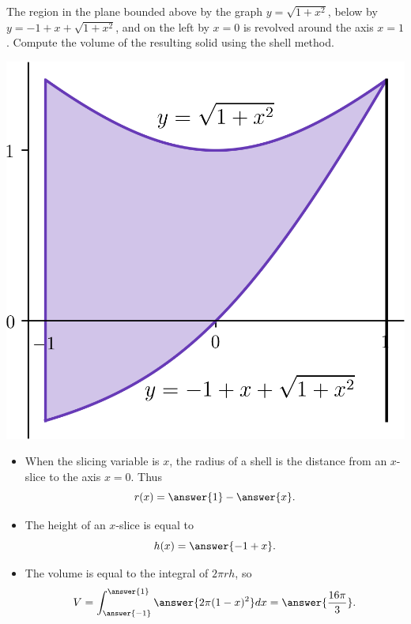 \documentclass{ximera}
\begin{document}
\begin{exercise}
The region in the plane bounded above by the graph $y = \sqrt{1+x^2}$, below by $y = -1 + x + \sqrt{1+x^2}$, and on the left by $x = 0$ is revolved around the axis $x = 1$. Compute the volume of the resulting solid using the shell method.
\begin{center}
\begin{image}
\includegraphics{shell/shell04.png}
\end{image}
\end{center}
\begin{itemize}
\item When the slicing variable is $x$, the radius of a shell is the  distance from an $x$-slice to the axis $x = 0$. Thus
\[ r(x) = \answer{1} - \answer{x}. \]
\item The height of an $x$-slice is equal to
\[ h(x) = \answer{-1+x}. \]
\item The volume is equal to the integral of $2 \pi r h$, so 
\[ V = \int_{\answer{-1}}^{\answer{1}} \answer{2 \pi (1-x)^2 } dx = \answer{\frac{16\pi}{3}}. \]
\end{itemize}
\end{exercise}
\end{document}
